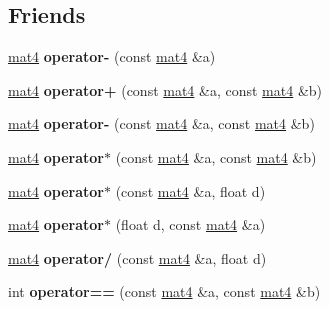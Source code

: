 \subsection*{Friends}
\begin{DoxyCompactItemize}
\item 
\hypertarget{classmat4_a2688c02473adf7c7d9064f4ba6bca442}{\hyperlink{classmat4}{mat4} {\bfseries operator-\/} (const \hyperlink{classmat4}{mat4} \&a)}\label{classmat4_a2688c02473adf7c7d9064f4ba6bca442}

\item 
\hypertarget{classmat4_ae376b416e75ef751d5c8cf206a5dfa82}{\hyperlink{classmat4}{mat4} {\bfseries operator+} (const \hyperlink{classmat4}{mat4} \&a, const \hyperlink{classmat4}{mat4} \&b)}\label{classmat4_ae376b416e75ef751d5c8cf206a5dfa82}

\item 
\hypertarget{classmat4_a3bd059d47c48840d752d73393740159a}{\hyperlink{classmat4}{mat4} {\bfseries operator-\/} (const \hyperlink{classmat4}{mat4} \&a, const \hyperlink{classmat4}{mat4} \&b)}\label{classmat4_a3bd059d47c48840d752d73393740159a}

\item 
\hypertarget{classmat4_a15e77864e523807c2e4d9172f58cc96b}{\hyperlink{classmat4}{mat4} {\bfseries operator$\ast$} (const \hyperlink{classmat4}{mat4} \&a, const \hyperlink{classmat4}{mat4} \&b)}\label{classmat4_a15e77864e523807c2e4d9172f58cc96b}

\item 
\hypertarget{classmat4_a19ed7c2c10c574be90105aced41c5aff}{\hyperlink{classmat4}{mat4} {\bfseries operator$\ast$} (const \hyperlink{classmat4}{mat4} \&a, float d)}\label{classmat4_a19ed7c2c10c574be90105aced41c5aff}

\item 
\hypertarget{classmat4_add647d3888643d52319ce1d84dcc0c90}{\hyperlink{classmat4}{mat4} {\bfseries operator$\ast$} (float d, const \hyperlink{classmat4}{mat4} \&a)}\label{classmat4_add647d3888643d52319ce1d84dcc0c90}

\item 
\hypertarget{classmat4_a6c37cfa39389cb018f81d8184c98a2f8}{\hyperlink{classmat4}{mat4} {\bfseries operator/} (const \hyperlink{classmat4}{mat4} \&a, float d)}\label{classmat4_a6c37cfa39389cb018f81d8184c98a2f8}

\item 
\hypertarget{classmat4_a7d8eba33162a18dd2b9538162fc890f3}{int {\bfseries operator==} (const \hyperlink{classmat4}{mat4} \&a, const \hyperlink{classmat4}{mat4} \&b)}\label{classmat4_a7d8eba33162a18dd2b9538162fc890f3}


\end{DoxyCompactItemize}
